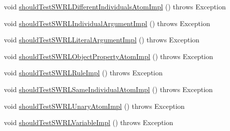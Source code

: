 \begin{DoxyCompactItemize}
\item 
void \hyperlink{classorg_1_1semanticweb_1_1owlapi_1_1contract_1_1_contract_owlapi__4_test_a9290838d671c32120fbba84afc41fea4}{should\-Test\-S\-W\-R\-L\-Different\-Individuals\-Atom\-Impl} ()  throws Exception 
\item 
void \hyperlink{classorg_1_1semanticweb_1_1owlapi_1_1contract_1_1_contract_owlapi__4_test_a3644be92195ff7d4cc0b444c3497969a}{should\-Test\-S\-W\-R\-L\-Individual\-Argument\-Impl} ()  throws Exception 
\item 
void \hyperlink{classorg_1_1semanticweb_1_1owlapi_1_1contract_1_1_contract_owlapi__4_test_aa435b46ff2389994eb4270a02794796c}{should\-Test\-S\-W\-R\-L\-Literal\-Argument\-Impl} ()  throws Exception 
\item 
void \hyperlink{classorg_1_1semanticweb_1_1owlapi_1_1contract_1_1_contract_owlapi__4_test_a7abd51e08077bfa91f06c450ef7a96d2}{should\-Test\-S\-W\-R\-L\-Object\-Property\-Atom\-Impl} ()  throws Exception 
\item 
void \hyperlink{classorg_1_1semanticweb_1_1owlapi_1_1contract_1_1_contract_owlapi__4_test_a3cdae188f4584e9d3147320dba526d49}{should\-Test\-S\-W\-R\-L\-Rule\-Impl} ()  throws Exception 
\item 
void \hyperlink{classorg_1_1semanticweb_1_1owlapi_1_1contract_1_1_contract_owlapi__4_test_ace29e2e59fed1ae72e9c55f252535f30}{should\-Test\-S\-W\-R\-L\-Same\-Individual\-Atom\-Impl} ()  throws Exception 
\item 
void \hyperlink{classorg_1_1semanticweb_1_1owlapi_1_1contract_1_1_contract_owlapi__4_test_a04bd3f54f34a47d3320ec788817ca69c}{should\-Test\-S\-W\-R\-L\-Unary\-Atom\-Impl} ()  throws Exception 
\item 
void \hyperlink{classorg_1_1semanticweb_1_1owlapi_1_1contract_1_1_contract_owlapi__4_test_a4b5bd0a41f29fdfd11419d3df80e2cb7}{should\-Test\-S\-W\-R\-L\-Variable\-Impl} ()  throws Exception 
\end{DoxyCompactItemize}


